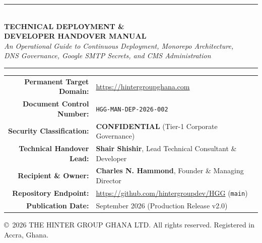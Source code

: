\documentclass[11pt,a4paper,oneside]{book}
\begin{document}
\begin{titlepage}
\begin{center}
  \vspace{0.8cm}

  {\color{HGGGold}\rule{0.6\textwidth}{1.5pt}}\\[0.4cm]
  {\fontsize{22}{26}\selectfont\scshape\bfseries\color{HGGNavy} TECHNICAL DEPLOYMENT \&\\[0.2cm] DEVELOPER HANDOVER MANUAL}\\[0.35cm]
  {\large\itshape\color{HGGAccentBlue} An Operational Guide to Continuous Deployment, Monorepo Architecture,\\ DNS Governance, Google SMTP Secrets, and CMS Administration}
  \\[0.4cm]
  {\color{HGGGold}\rule{0.6\textwidth}{1.5pt}}

  \vspace{0.8cm}

  \begin{tcolorbox}[
    width=0.88\textwidth,
    colback=HGGCanvas,
    colframe=HGGBorder,
    arc=2mm,
    boxrule=0.8pt,
    left=14pt,right=14pt,top=8pt,bottom=8pt
  ]
    \centering\footnotesize
    \begin{tabularx}{\linewidth}{rX}
      \textbf{Permanent Target Domain:} & \url{https://hintergroupghana.com} \\
      \textbf{Document Control Number:} & \texttt{HGG-MAN-DEP-2026-002} \\
      \textbf{Security Classification:} & \textbf{\color{HGGRed}CONFIDENTIAL} (Tier-1 Corporate Governance) \\
      \textbf{Technical Handover Lead:} & \textbf{Shair Shishir}, Lead Technical Consultant \& Developer \\
      \textbf{Recipient \& Owner:} & \textbf{Charles N. Hammond}, Founder \& Managing Director \\
      \textbf{Repository Endpoint:} & \url{https://github.com/hintergroupdev/HGG} (\texttt{main}) \\
      \textbf{Publication Date:} & September 2026 (Production Release v2.0) \\
    \end{tabularx}
  \end{tcolorbox}

  \vfill

  {\scriptsize\color{HGGMutedText} \copyright\ 2026 THE HINTER GROUP GHANA LTD. All rights reserved. Registered in Accra, Ghana.}
\end{center}
\end{titlepage}
\nopagecolor
\end{document}
